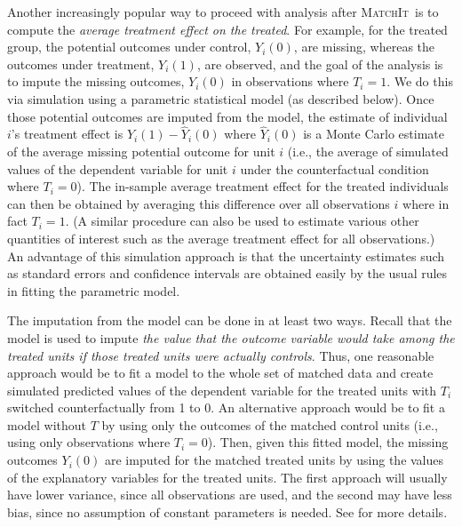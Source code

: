 \documentclass[oneside,letterpaper,titlepage]{article}
\newcommand{\MatchIt}{\textsc{MatchIt}}
\begin{document}
Another increasingly popular way to proceed with analysis after
\MatchIt\ is to compute the \emph{average treatment effect on the
  treated}.  For example, for the treated group, the potential
outcomes under control, $Y_i(0)$, are missing, whereas the outcomes
under treatment, $Y_i(1)$, are observed, and the goal of the analysis
is to impute the missing outcomes, $Y_i(0)$ in observations where
$T_i=1$.  We do this via simulation using a parametric statistical
model (as described below).  Once those potential outcomes are imputed
from the model, the estimate of individual $i$'s treatment effect is
$Y_i(1)-\widehat{Y}_i(0)$ where $\widehat{Y}_i(0)$ is a Monte Carlo
estimate of the average missing potential outcome for unit $i$ (i.e.,
the average of simulated values of the dependent variable for unit $i$
under the counterfactual condition where $T_i=0$).  The in-sample
average treatment effect for the treated individuals can then be
obtained by averaging this difference over all observations $i$ where
in fact $T_i=1$.  (A similar procedure can also be used to estimate
various other quantities of interest such as the average treatment
effect for all observations.)  An advantage of this simulation
approach is that the uncertainty estimates such as standard errors and
confidence intervals are obtained easily by the usual rules in fitting
the parametric model.

The imputation from the model can be done in at least two ways.
Recall that the model is used to impute \emph{the value that the
  outcome variable would take among the treated units if those treated
  units were actually controls}.  Thus, one reasonable approach would
be to fit a model to the whole set of matched data and create
simulated predicted values of the dependent variable for the treated
units with $T_i$ switched counterfactually from 1 to 0.  An
alternative approach would be to fit a model without $T$ by using only
the outcomes of the matched control units (i.e., using only
observations where $T_i=0$).  Then, given this fitted model, the
missing outcomes $Y_i(0)$ are imputed for the matched treated units by
using the values of the explanatory variables for the treated units.
The first approach will usually have lower variance, since all
observations are used, and the second may have less bias, since no
assumption of constant parameters is needed.  See \citet*{HoImaKin05}
for more details.

\end{document}
